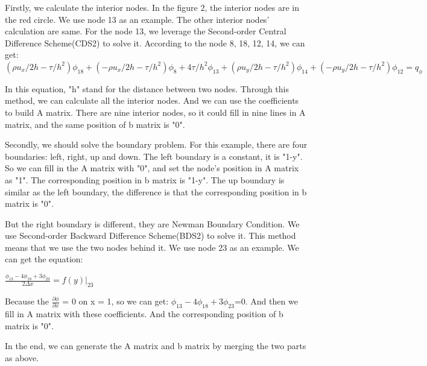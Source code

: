 \documentclass{article}
\begin{document}
\begin{spacing}{1.1}
\begin{itemize}
    Firstly, we calculate the interior nodes. In the figure 2, the interior nodes are in the red circle. We use node 13 as an example. The other interior nodes' calculation are same. For the node 13, we leverage the Second-order Central Difference Scheme(CDS2) to solve it. According to the node 8, 18, 12, 14, we can get: \newline\newline
    $(\rho u_x/2h - \tau / h^2)\phi_{18}  + (-\rho u_x/2h - \tau / h^2)\phi_8 + 4 \tau/h^2 \phi_{13} + (\rho u_y/2h - \tau / h^2)\phi_{14}  + (-\rho u_y/2h - \tau / h^2)\phi_{12} = q_\phi$  \newline\newline

    In this equation, "h" stand for the distance between two nodes. Through this method, we can calculate all the interior nodes. And we can use the coefficients to build A matrix. There are nine interior nodes, so it could fill in nine lines in A matrix, and the same position of b matrix is "0". \newline
    
    Secondly, we should solve the boundary problem. For this example, there are four boundaries: left, right, up and down. The left boundary is a constant, it is "1-y". So we can fill in the A matrix with "0", and set the node's position in A matrix as "1". The corresponding position in b matrix is "1-y". The up boundary is similar as the left boundary, the difference is that the corresponding position in b matrix is "0".\newline 
    
    But the right boundary is different, they are Newman Boundary Condition. We use Second-order Backward Difference Scheme(BDS2) to solve it. This method means that we use the two nodes behind it. We use node 23 as an example. We can get the equation:\newline\newline
    \centerline{$\frac{\phi_13 - 4 \phi _{18} + 3\phi_{23} }{2\Delta x} = f(y)|_{23}$}\newline\newline
    Because the $\frac{\partial \phi}{\partial x}$ = 0 on x = 1, so we can get: 
    ${\phi_{13} - 4 \phi _{18} + 3\phi_{23}}$=0. And then we fill in A matrix with these coefficients. And the corresponding position of b matrix is "0". \newline
    
    In the end, we can generate the A matrix and b matrix by merging the two parts as above. 
    

\end{itemize}
\end{spacing}
\end{document}
